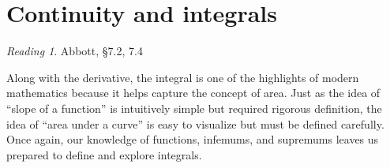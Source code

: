 \documentclass[11pt,oneside]{amsbook}
\theoremstyle{definition}
\newtheorem{exerc}{Exercise}[section]
\theoremstyle{plain}
\theoremstyle{definition}
\theoremstyle{remark}
\newtheorem*{reading}{Reading}
\numberwithin{equation}{section}
\numberwithin{figure}{section}
\begin{document}



\newpage
\section{Continuity and integrals}

\begin{reading}
  Abbott, \S 7.2, 7.4
\end{reading}

Along with the derivative, the integral is one of the highlights of modern mathematics because it helps capture the concept of area. Just as the idea of ``slope of a function'' is intuitively simple but required rigorous definition, the idea of ``area under a curve'' is easy to visualize but must be defined carefully. Once again, our knowledge of functions, infemums, and supremums leaves us prepared to define and explore integrals.
\end{document}
